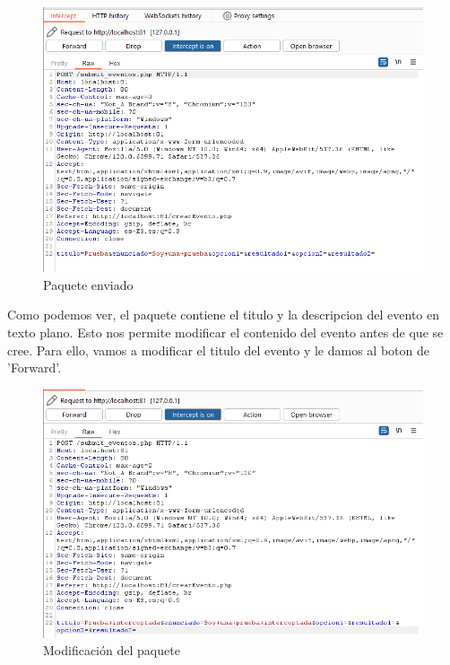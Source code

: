 \documentclass{report}
\begin{document}
                \begin{figure}[H]
                    \centering
                    \includegraphics[width=1\textwidth]{./img/vulnerabilidades/2.2/2.3.png}
                    \caption{Paquete enviado}
                \end{figure}
                \clearpage
                Como podemos ver, el paquete contiene el titulo y la descripcion del evento en texto plano.
                Esto nos permite modificar el contenido del evento antes de que se cree.
                Para ello, vamos a modificar el titulo del evento y le damos al boton de 'Forward'.
                \begin{figure}[H]
                    \centering
                    \includegraphics[width=1\textwidth]{./img/vulnerabilidades/2.2/2.4.png}
                    \caption{Modificación del paquete}
                \end{figure}
\end{document}
